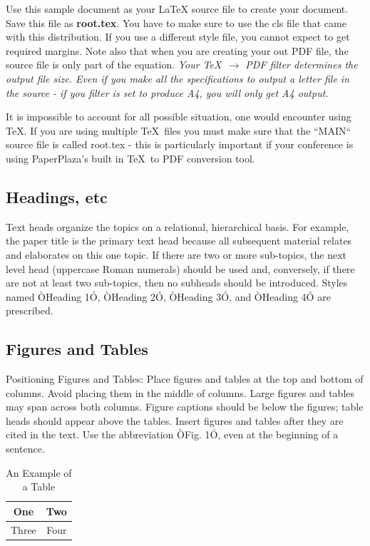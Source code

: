 \documentclass[a4paper, 10pt, conference]{IEEEconf}
\begin{document}
Use this sample document as your LaTeX source file to create your document. Save this file as {\bf root.tex}. You have to make sure to use the cls file that came with this distribution. If you use a different style file, you cannot expect to get required margins. Note also that when you are creating your out PDF file, the source file is only part of the equation. {\it Your \TeX\ $\rightarrow$ PDF filter determines the output file size. Even if you make all the specifications to output a letter file in the source - if you filter is set to produce A4, you will only get A4 output. }

It is impossible to account for all possible situation, one would encounter using \TeX. If you are using multiple \TeX\ files you must make sure that the ``MAIN`` source file is called root.tex - this is particularly important if your conference is using PaperPlaza's built in \TeX\ to PDF conversion tool.

\subsection{Headings, etc}

Text heads organize the topics on a relational, hierarchical basis. For example, the paper title is the primary text head because all subsequent material relates and elaborates on this one topic. If there are two or more sub-topics, the next level head (uppercase Roman numerals) should be used and, conversely, if there are not at least two sub-topics, then no subheads should be introduced. Styles named ÒHeading 1Ó, ÒHeading 2Ó, ÒHeading 3Ó, and ÒHeading 4Ó are prescribed.

\subsection{Figures and Tables}

Positioning Figures and Tables: Place figures and tables at the top and bottom of columns. Avoid placing them in the middle of columns. Large figures and tables may span across both columns. Figure captions should be below the figures; table heads should appear above the tables. Insert figures and tables after they are cited in the text. Use the abbreviation ÒFig. 1Ó, even at the beginning of a sentence.

\begin{table}[h]
\caption{An Example of a Table}
\label{table_example}
\begin{center}
\begin{tabular}{|c||c|}
\hline
One & Two\\
\hline
Three & Four\\
\hline
\end{tabular}
\end{center}
\end{table}
\end{document}

